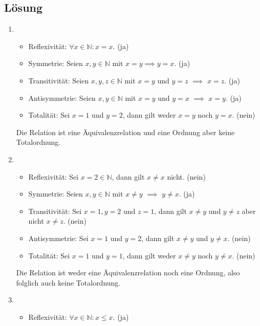 \documentclass[german,12pt]{homework}
\newcommand{\NN}{\mathbb{N}}
\begin{document}
    \subsection*{Lösung}
    \begin{enumerate}
        \item\ \\
        \begin{itemize}
    		\item Reflexivität: \({\forall}x \in \NN: x = x\). (ja)
    		\item Symmetrie: Seien \(x, y \in \NN\) mit \(x = y \implies y =
            x\). (ja)
    		\item Transitivität: Seien \(x, y, z \in \NN\) mit \(x = y\) und
            \(y = z\) \(\implies\) \(x = z\). (ja)
    		\item Antisymmetrie: Seien \(x, y \in \NN\) mit \(x = y\) und \(y =
            x\) \(\implies\) \(x = y\). (ja)
    		\item Totalität: Sei \(x = 1\) und \(y = 2\), dann gilt weder \(x =
            y\) noch \(y = x\). (nein)
    	\end{itemize}
    	Die Relation ist eine Äquivalenzrelation und eine Ordnung aber keine
        Totalordnung.
        \item\ \\
        \begin{itemize}
    		\item Reflexivität: Sei \(x = 2 \in \NN\), dann gilt \(x \ne x\)
            nicht. (nein)
    		\item Symmetrie: Seien \(x, y \in \NN\) mit \(x \ne y\)
            \(\implies\) \(y \ne x\). (ja)
    		\item Transitivität: Sei \(x = 1, y = 2\) und \(z = 1\), dann gilt
            \(x \ne y\) und \(y \ne z\) aber nicht \(x \ne z\). (nein)
    		\item Antisymmetrie: Sei \(x = 1\) und \(y = 2\), dann gilt \(x \ne
            y\) und \(y \ne x\). (nein)
    		\item Totalität: Sei \(x = 1\) und \(y = 1\), dann gilt weder \(x
            \ne y\) noch \(y \ne x\). (nein)
    	\end{itemize}
    	Die Relation ist weder eine Äquivalenzrelation noch eine Ordnung, also
        folglich auch keine Totalordnung.
        \item\ \\
        \begin{itemize}
    		\item Reflexivität: \({\forall}x \in \NN: x \le x\). (ja)

\end{itemize}
\end{enumerate}
\end{document}
